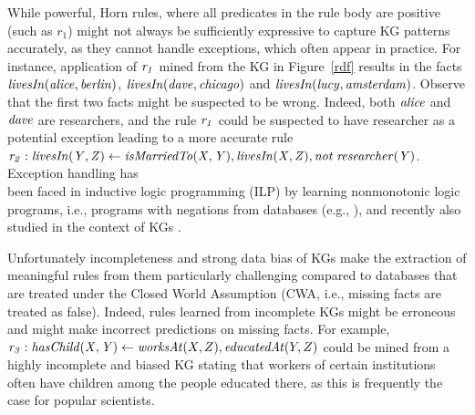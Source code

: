 While powerful, Horn rules, where all predicates in the rule body are positive (such as $r_1$) might not always be sufficiently expressive %
to capture KG patterns accurately, as they  cannot handle exceptions, which often appear in practice. 
For instance, application of $\mathit{r_1}$ mined from the KG in Figure~\ref{rdf} results in the facts $\mathit{livesIn(alice,berlin)}$, $\mathit{livesIn(dave,chicago)}$ and $\mathit{livesIn(lucy,amsterdam)}$. Observe that the first two facts might be suspected to be wrong. Indeed, both $\mathit{alice}$ and $\mathit{dave}$ are researchers, and the rule $\mathit{r_1}$ could be suspected to have researcher as a potential exception leading to a more accurate rule $\mathit{r_2:\;}\mathit{livesIn(Y,Z)}\leftarrow \mathit{isMarriedTo(X,Y),livesIn(X,Z), not\;researcher(Y)}$.
Exception handling has \\been faced in inductive logic programming (ILP) by learning nonmonotonic logic programs, i.e., programs with negations from databases (e.g., \cite{DBLP:conf/ijcai/InoueK97,DBLP:journals/tocl/Sakama05,R08}), and recently also studied in the context of KGs \cite{gad2016,rumis}.


Unfortunately incompleteness and strong data bias of KGs make the extraction of meaningful rules from them particularly challenging compared to databases that are treated under the Closed World Assumption (CWA, i.e., missing facts are treated as false). Indeed, rules learned from incomplete KGs might be erroneous and might make incorrect predictions on missing facts. 
For example, $\mathit{r_3}: \mathit{hasChild(X,Y)}\leftarrow \mathit{worksAt}(X,Z),\mathit{educatedAt}(Y,Z)$ could be mined from a highly incomplete and biased KG stating that workers of certain institutions often have children among the people educated there, 
as this is frequently the case for popular scientists.





